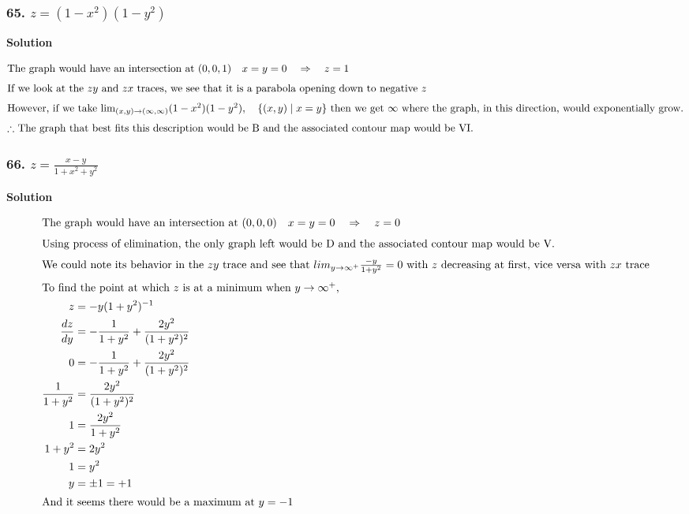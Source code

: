 \documentclass{article}
\newcommand\rr{\quad\Rightarrow\quad}
\newcommand{\limit}[4]{\lim_{(#1, #2) \to (#3, #4)}}
\newcommand{\such}{\; | \;}
\begin{document}
\subsubsection*{65. $z = (1-x^2)(1-y^2)$}
\centerline{\textbf{Solution}}
\begin{align*}
    \intertext{The graph would have an intersection at  $(0,0,1) \quad x=y=0 \rr z=1$}
    \intertext{If we look at the $zy$ and $zx$ traces, we see that it is a parabola opening down to negative $z$}
    \intertext{However, if we take $\limit x y \infty \infty (1-x^2)(1-y^2), \quad \{(x,y) \such x = y\}$ then we get $\infty$ where the graph, in this direction, would exponentially grow.}
    \intertext{$\therefore$ The graph that best fits this description would be B and the associated contour map would be VI.}
\end{align*}
\subsubsection*{66. $z = \displaystyle\frac{x-y}{1+ x^2+ y^2}$}
\centerline{\textbf{Solution}}
\begin{align*}
    \intertext{The graph would have an intersection at  $(0,0,0) \quad x=y=0 \rr z=0$}
    \intertext{Using process of elimination, the only graph left would be D and the associated contour map would be V.}
    \intertext{We could note its behavior in the $zy$ trace and see that $lim_{y \to \infty^+} \frac{-y}{1 + y^2} = 0$ with $z$ decreasing at first, vice versa with $zx$ trace}
    \intertext{To find the point at which $z$ is at a minimum when $y \to \infty^+$,}
    z &= -y(1+y^2)^{-1} \\
    \frac{dz}{dy} &= -\frac{1}{1+y^2} + \frac{2y^2}{(1+y^2)^{2}} \\
    0 &= -\frac{1}{1+y^2} + \frac{2y^2}{(1+y^2)^{2}} \\
    \frac{1}{1+y^2} &= \frac{2y^2}{(1+y^2)^{2}} \\
    1 &= \frac{2y^2}{1+y^2} \\
    1 + y^2 &= 2y^2 \\
    1 &= y^2 \\
    y &= \pm 1 = +1 \\
    \intertext{And it seems there would be a maximum at $y = -1$}
\end{align*}
\end{document}
